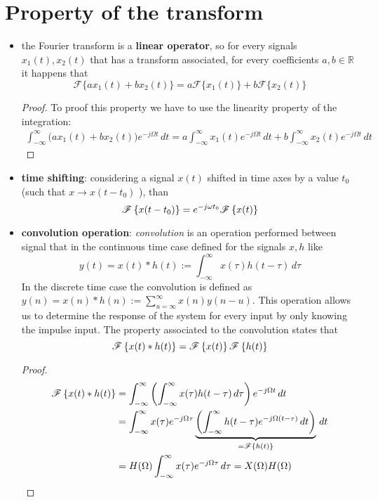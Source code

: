 \section{Property of the transform}
	\begin{itemize}
		\item the Fourier transform is a \textbf{linear operator}, so for every signals $x_1(t),x_2(t)$ that has a transform associated, for every coefficients $a,b\in \mathds R$ it happens that
		\[ \mathscr{F} \big\{ a x_1(t) + b x_2(t) \big\} = a \mathscr{F}\big\{x_1(t)\big\} + b \mathscr{F}\big\{x_2(t)\big\}\]
		\begin{proof}
			To proof this property we have to use the linearity property of the integration:
			\begin{align*}
				\int_{-\infty}^\infty \Big(a x_1 (t) + bx_2(t)\Big) e ^{-j\Omega t} \, dt = a \int_{-\infty}^\infty x_1 (t)  e ^{-j\Omega t} \, dt + b \int_{-\infty}^\infty x_2 (t)  e ^{-j\Omega t} \, dt 
			\end{align*}
		\end{proof}
		
		\item \textbf{time shifting}: considering a signal $x(t)$ shifted in time axes by a value $t_0$ (such that $x \rightarrow x(t-t_0)$ ), than
		\[ \mathscr{F}\left\{ x(t-t_0) \right\} = e^{-j\omega t_0} \mathscr{F}\left\{ x(t) \right\} \]
		
		\item \textbf{convolution operation}: \textit{convolution} is an operation performed between signal that in the continuous time case defined for the signals $x,h$ like
		\[y(t) = x(t) * h(t) := \int_{-\infty}^\infty x(\tau) h(t-\tau)\, d\tau \]
		In the discrete time case the convolution is defined as $y(n) = x(n)*h(n) := \sum_{u=\infty}^\infty x(n) y(n-u)$. This operation allows us to determine the response of the system for every input by only knowing the impulse input. The property associated to the convolution states that
		\[ \mathscr{F}\left\{ x(t) * h(t) \right\} = \mathscr{F}\left\{ x(t) \right\} \mathscr{F}\left\{ h(t) \right\} \]
		\begin{proof}
			\begin{align*}
				\mathscr{F}\left\{ x(t) * h(t) \right\} & = \int_{-\infty}^\infty \left( \int_{-\infty}^\infty x(\tau) h(t-\tau)\, d\tau \right) e^{-j\Omega t} \, dt \\
				& =  \int_{-\infty}^\infty x(\tau) e^{-j\Omega \tau} \underbrace{\left( \int_{-\infty}^\infty h(t-\tau) e^{-j\Omega(t-\tau)} \, dt \right)}_{=\mathscr{F}\left\{ h(t) \right\}} \, dt \\
				& = H(\Omega) \int_{-\infty}^\infty x(\tau) e^{-j\Omega \tau} \, d\tau = X(\Omega) H(\Omega)
			\end{align*}
		\end{proof}
	

\end{itemize}
